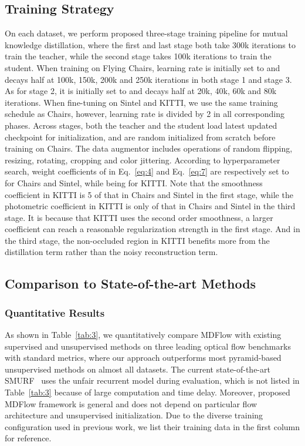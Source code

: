 \documentclass[lettersize,journal]{IEEEtran}
\begin{document}
\subsection{Training Strategy} \label{Training Strategy}
On each dataset, we perform proposed three-stage training pipeline for mutual knowledge distillation, where the first and last stage both take 300k iterations to train the teacher, while the second stage takes 100k iterations to train the student. When training on Flying Chairs, learning rate is initially set to  and decays half at 100k, 150k, 200k and 250k iterations in both stage 1 and stage 3. As for stage 2, it is initially set to  and decays half at 20k, 40k, 60k and 80k iterations. When fine-tuning on Sintel and KITTI, we use the same training schedule as Chairs, however, learning rate is divided by 2 in all corresponding phases. Across stages, both the teacher and the student load latest updated checkpoint for initialization, and are random initialized from scratch before training on Chairs. The data augmentor  includes operations of random flipping, resizing, rotating, cropping and color jittering. According to hyperparameter search, weight coefficients of  in Eq.~\ref{eq:4} and Eq.~\ref{eq:7} are respectively set to  for Chairs and Sintel, while being  for KITTI. Note that the smoothness coefficient  in KITTI is 5  of that in Chairs and Sintel in the first stage, while the photometric coefficient  in KITTI is only  of that in Chairs and Sintel in the third stage. It is because that KITTI uses the second order smoothness, a larger coefficient can reach a reasonable regularization strength in the first stage. And in the third stage, the non-occluded region in KITTI benefits more from the distillation term rather than the noisy reconstruction term.

\subsection{Comparison to State-of-the-art Methods}
\subsubsection{Quantitative Results}
As shown in Table~\ref{tab:3}, we quantitatively compare MDFlow with existing supervised and unsupervised methods on three leading optical flow benchmarks with standard metrics, where our approach outperforms most pyramid-based unsupervised methods on almost all datasets. The current state-of-the-art SMURF~\cite{Stone_2021_CVPR} uses the unfair recurrent model during evaluation, which is not listed in Table~\ref{tab:3} because of large computation and time delay. Moreover, proposed MDFlow framework is general and does not depend on particular flow architecture and unsupervised initialization. Due to the diverse training configuration used in previous work, we list their training data in the first column for reference.
\end{document}
